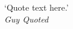 
\clearpage

\narrowlinespacing

\vspace*{4mm}

`Quote text here.'\\
\emph{Guy Quoted}

\normallinespacing

